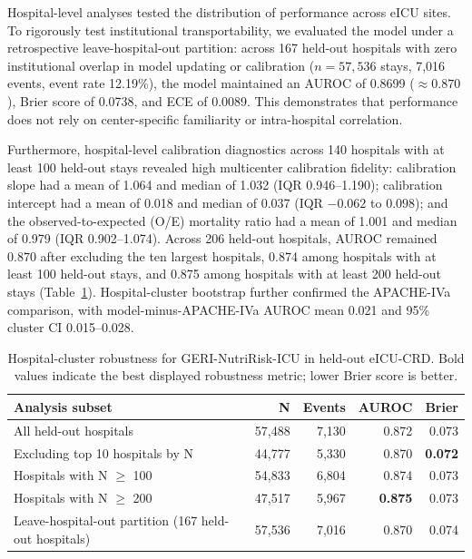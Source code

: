 \documentclass[utf8]{FrontiersinVancouver}
\newcommand{\re}[1]{#1}
\begin{document}
Hospital-level analyses tested the distribution of performance across eICU sites. \re{To rigorously test institutional transportability, we evaluated the model under a retrospective leave-hospital-out partition: across 167 held-out hospitals with zero institutional overlap in model updating or calibration ($n=57,536$ stays, 7,016 events, event rate 12.19\%), the model maintained an AUROC of 0.8699 ($\approx 0.870$), Brier score of 0.0738, and ECE of 0.0089. This demonstrates that performance does not rely on center-specific familiarity or intra-hospital correlation.}

\re{Furthermore, hospital-level calibration diagnostics across 140 hospitals with at least 100 held-out stays revealed high multicenter calibration fidelity: calibration slope had a mean of 1.064 and median of 1.032 (IQR 0.946--1.190); calibration intercept had a mean of 0.018 and median of 0.037 (IQR $-0.062$ to $0.098$); and the observed-to-expected (O/E) mortality ratio had a mean of 1.001 and median of 0.979 (IQR 0.902--1.074). Across 206 held-out hospitals, AUROC remained 0.870 after excluding the ten largest hospitals, 0.874 among hospitals with at least 100 held-out stays, and 0.875 among hospitals with at least 200 held-out stays (Table~\ref{tab:hospital}). Hospital-cluster bootstrap further confirmed the APACHE-IVa comparison, with model-minus-APACHE-IVa AUROC mean 0.021 and 95\% cluster CI 0.015--0.028.}

\begin{table}[htbp]
\centering
\caption{Hospital-cluster robustness for GERI-NutriRisk-ICU in held-out eICU-CRD. Bold values indicate the best displayed robustness metric; lower Brier score is better.}
\label{tab:hospital}
\begin{tabular}{lrrrr}
\toprule
Analysis subset & N & Events & AUROC & Brier\\
\midrule
All held-out hospitals & 57,488 & 7,130 & 0.872 & 0.073\\
Excluding top 10 hospitals by N & 44,777 & 5,330 & 0.870 & \textbf{0.072}\\
Hospitals with N $\geq$ 100 & 54,833 & 6,804 & 0.874 & 0.073\\
Hospitals with N $\geq$ 200 & 47,517 & 5,967 & \textbf{0.875} & 0.073\\
\re{Leave-hospital-out partition (167 held-out hospitals)} & \re{57,536} & \re{7,016} & \re{0.870} & \re{0.074}\\
\bottomrule
\end{tabular}
\end{table}
\end{document}
